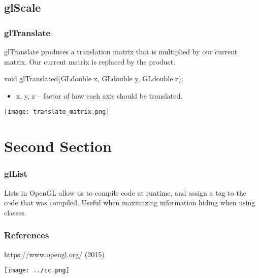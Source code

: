\documentclass{beamer}
\begin{document}

          \subsection{glScale}
          \begin{frame}
            \frametitle{glTranslate}
            glTranslate produces a translation matrix that is multiplied by our current matrix. Our current matrix is replaced by the product.
            \begin{block}{void glTranslated(GLdouble x, GLdouble y, GLdouble z);}
              \begin{itemize}
              \item x, y, z -- factor of how each axis should be translated.
              \end{itemize}
            \end{block}
            \texttt{[image: translate\_matrix.png]}
          \end{frame}


          \section{Second Section}
          \begin{frame}
            \frametitle{glList}
            Lists in OpenGL allow us to compile code at runtime, and assign a tag to the code that was compiled. Useful when maximizing information hiding when using classes.
          \end{frame}

          \begin{frame}
            \frametitle{References}
            \footnotesize {
              \begin{thebibliography}{99}
               https://www.opengl.org/ (2015)
              \end{thebibliography}
            }
            \texttt{[image: ../cc.png]}

          \end{frame}

          
\end{document}
